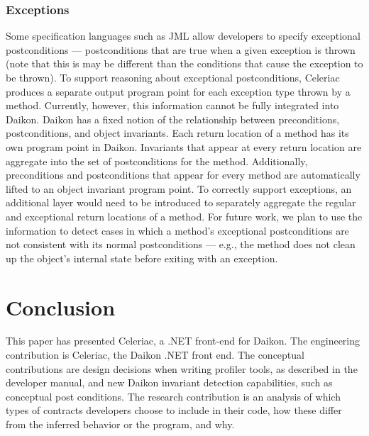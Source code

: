 \documentclass{article}
\newcommand{\todo}[1]{{\color{red}\bfseries [[#1]]}}
\begin{document}
 \subsubsection{Exceptions}
 Some specification languages such as JML allow developers to specify
 exceptional postconditions --- postconditions that are true when a
 given exception is thrown (note that this is may be different than the
 conditions that cause the exception to be thrown).
 To support reasoning about exceptional postconditions, Celeriac
 produces a separate output program point for each exception type
 thrown by a method. Currently, however, this information cannot be
 fully integrated into Daikon.
 Daikon has a fixed notion of the relationship between preconditions,
 postconditions, and object invariants. Each return location of a
 method has its own program point in Daikon. Invariants that appear at
 every return location are aggregate into the set of postconditions for
 the method. Additionally, preconditions and postconditions that appear
 for every method are automatically lifted to an object invariant
 program point.
 To correctly support exceptions, an additional layer would need to be
 introduced to separately aggregate the regular and exceptional return
 locations of a method.
%
 For future work, we plan to use the information to detect cases in
 which a method's exceptional postconditions are not consistent with
 its normal postconditions --- e.g., the method does not clean up the
 object's internal state before exiting with an exception.


\section{Conclusion}
This paper has presented Celeriac, a .NET front-end for Daikon. The engineering contribution is Celeriac, the Daikon .NET front end. The conceptual contributions are design decisions when writing profiler tools, as described in the developer manual, and new Daikon invariant detection capabilities, such as conceptual post conditions. The research contribution is an analysis of which types of contracts developers choose to include in their code, how these differ from the inferred behavior or the program, and why.

\newpage


\end{document}
